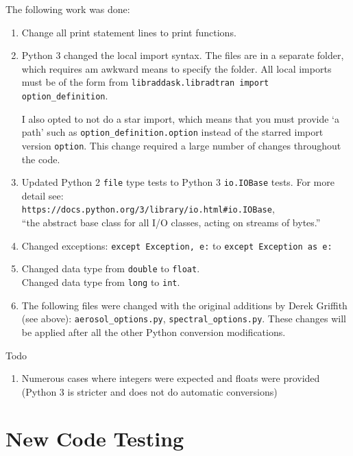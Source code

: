 The following work was done:
\begin{enumerate}
\item Change all print statement lines to print functions.

\item Python 3 changed the local import syntax. The \libradtran{} files are in a separate folder, which requires am awkward means to specify the folder.
     All local imports must be of the form from \lstinline{libraddask.libradtran import option_definition}. 
     
     I also opted to not do a star import, which means that you must provide `a path' such as 
     \lstinline{option_definition.option} instead of the starred import version \lstinline{option}.  This change required a large number of changes throughout the code.

\item Updated Python 2 \lstinline{file} type tests to Python 3 \lstinline{io.IOBase} tests. For more detail see:\\
\lstinline{https://docs.python.org/3/library/io.html#io.IOBase},\\ ``the abstract base class for all I/O classes, acting on streams of bytes.''

\item
Changed exceptions:
\lstinline{except Exception, e:} to 
\lstinline{except Exception as e:}

\item 
Changed data type from \lstinline{double} to \lstinline{float}.\\
Changed data type from \lstinline{long} to \lstinline{int}.


\item 
The following files were changed with the original additions by Derek Griffith (see above):
\lstinline{aerosol_options.py}, \lstinline{spectral_options.py}.  These changes will be applied after all the other Python conversion modifications.


\end{enumerate}

Todo
\begin{enumerate}

\item Numerous cases where integers were expected and floats were provided (Python 3 is stricter and does not do automatic conversions)

\end{enumerate}

\section{New Code Testing}
